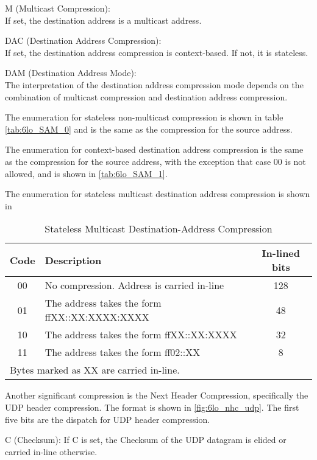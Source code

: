 M (Multicast Compression):\\
If set, the destination address is a multicast address.

DAC (Destination Address Compression):\\
If set, the destination address compression is context-based.
If not, it is stateless.

DAM (Destination Address Mode):\\
The interpretation of the destination address compression mode depends on the combination of multicast compression and destination address compression.

The enumeration for stateless non-multicast compression is shown in table \autoref{tab:6lo_SAM_0} and is the same as the compression for the source address.

The enumeration for context-based destination address compression is the same as the compression for the source address,
with the exception that case 00 is not allowed, and is shown in \autoref{tab:6lo_SAM_1}.

The enumeration for stateless multicast destination address compression is shown in 

\begin{table}[h!]
	\centering
	\caption{Stateless Multicast Destination-Address Compression}
	\begin{tabular}{|c|l|c|} \hline
	Code & Description                                   & In-lined bits\\ \hline \hline
	00   & No compression. Address is carried in-line    & 128 \\ \hline
	01   & The address takes the form ffXX::XX:XXXX:XXXX & 48  \\ \hline
	10   & The address takes the form ffXX::XX:XXXX      & 32  \\ \hline
	11   & The address takes the form ff02::XX           & 8   \\ \hline
	\multicolumn{3}{l}{Bytes marked as XX are carried in-line.}\\
	\end{tabular}
	\label{tab:6lo_DAC_M}
\end{table}



Another significant compression is the Next Header Compression, specifically the UDP header compression.
The format is shown in \autoref{fig:6lo_nhc_udp}. The first five bits are the dispatch for UDP header compression.

C (Checksum):
If C is set, the Checksum of the UDP datagram is elided or carried in-line otherwise.


